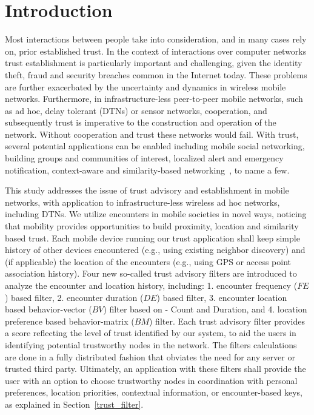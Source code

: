 \documentclass[10pt,conference]{IEEEtran}
\begin{document}
\section{Introduction}
Most interactions between people take into consideration, and in many cases rely on, prior established trust. In the context of interactions over computer networks trust establishment is particularly important and challenging, given the identity theft, fraud and security breaches common in the Internet today. These problems are further exacerbated by the uncertainty and dynamics in wireless mobile networks. Furthermore, in infrastructure-less peer-to-peer mobile networks, such as ad hoc, delay tolerant (DTNs) or sensor networks, cooperation, and subsequently trust is imperative to the construction and operation of the network. Without cooperation and trust these networks would fail. With trust, several potential applications can be enabled including mobile social networking, building groups and communities of interest, localized alert and emergency notification, context-aware and similarity-based networking~\cite{profilecast}, to name a few.

This study addresses the issue of trust advisory and establishment in mobile networks, with application to infrastructure-less wireless ad hoc networks, including DTNs. We utilize encounters in mobile societies in novel ways, noticing that mobility provides opportunities to build proximity, location and similarity based trust. Each mobile device running our trust application shall keep simple history of other devices encountered (e.g., using existing neighbor discovery) and (if applicable) the location of the encounters (e.g., using GPS or access point association history). Four new so-called trust advisory filters are introduced to analyze the encounter and location history, including: 1. encounter frequency ($FE$) based filter, 2. encounter duration ($DE$) based filter, 3. encounter location based behavior-vector ($BV$)  filter  based on - Count and  Duration, and 4. location preference based behavior-matrix ($BM$) filter. Each trust advisory filter provides a score reflecting the level of trust identified by our system, to aid the users in identifying potential trustworthy nodes in the network. The filters calculations are done in a fully distributed fashion that obviates the need for any server or trusted third party. Ultimately, an application with these filters shall provide the user with an option to choose trustworthy nodes in coordination with personal preferences, location priorities, contextual information, or encounter-based keys, as explained in Section~\ref{trust_filter}.
\end{document}
